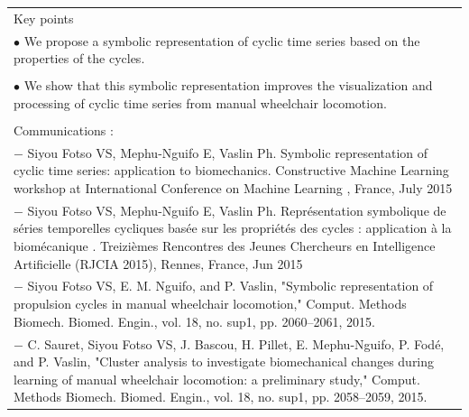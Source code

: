  
 \begin{table}[ht]
\centering
\begin{tabular}{|p{15cm}|}

\hline
\rowcolor{LavenderBlush}
Key points\\
$\bullet$ We propose a symbolic representation of cyclic time series based  on the properties of the cycles. \\
\\
$\bullet$ We show that this symbolic representation improves the  visualization and processing of cyclic time series from manual wheelchair locomotion.\\ 
\\
Communications :\\
$-$ Siyou Fotso VS, Mephu-Nguifo E, Vaslin Ph. Symbolic representation of cyclic time series: application to biomechanics. Constructive Machine Learning workshop at International Conference on Machine Learning , France, July 2015\\

$-$ Siyou Fotso VS, Mephu-Nguifo E, Vaslin Ph. Représentation symbolique de séries temporelles cycliques basée sur les propriétés des cycles : application  à la biomécanique . Treizièmes Rencontres des Jeunes Chercheurs en Intelligence  Artificielle (RJCIA 2015), Rennes, France, Jun 2015\\

$-$ Siyou Fotso VS, E. M. Nguifo, and P. Vaslin, "Symbolic representation of propulsion cycles in manual wheelchair locomotion," Comput. Methods  Biomech. Biomed. Engin., vol. 18, no. sup1, pp. 2060–2061, 2015.\\

$-$ C. Sauret, Siyou Fotso VS, J. Bascou, H. Pillet, E. Mephu-Nguifo, P. Fodé, and P. Vaslin, "Cluster analysis to investigate biomechanical changes during learning  of manual wheelchair locomotion: a preliminary study," Comput. Methods Biomech. Biomed. Engin., vol. 18, no. sup1, pp. 2058–2059, 2015.\\

 
\hline
\end{tabular}
\end{table}